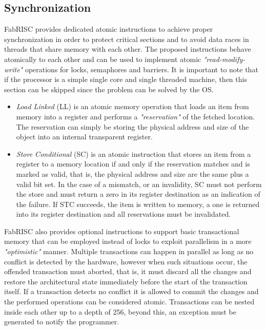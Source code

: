 \documentclass{article}
\begin{document}
        \subsection{Synchronization}

            FabRISC provides dedicated atomic instructions to achieve proper synchronization in order to protect critical sections and to avoid data races in threads that share memory with each other. The proposed instructions behave atomically to each other and can be used to implement atomic \textit{"read-modify-write"} operations for locks, semaphores and barriers. It is important to note that if the processor is a simple single core and single threaded machine, then this section can be skipped since the problem can be solved by the OS.

            \begin{itemize}

                \item \textit{Load Linked} (LL) is an atomic memory operation that loads an item from memory into a register and performs a \textit{"reservation"} of the fetched location. The reservation can simply be storing the physical address and size of the object into an internal transparent register.
                \item \textit{Store Conditional} (SC) is an atomic instruction that stores an item from a register to a memory location if and only if the reservation matches and is marked as valid, that is, the physical address and size are the same plus a valid bit set. In the case of a mismatch, or an invalidity, SC must not perform the store and must return a zero in its register destination as an indication of the failure. If STC succeeds, the item is written to memory, a one is returned into its register destination and all reservations must be invalidated.

            \end{itemize}

            FabRISC also provides optional instructions to support basic transactional memory that can be employed instead of locks to exploit parallelism in a more \textit{"optimistic"} manner. Multiple transactions can happen in parallel as long as no conflict is detected by the hardware, however when such situations occur, the offended transaction must aborted, that is, it must discard all the changes and restore the architectural state immediately before the start of the transaction itself. If a transaction detects no conflict it is allowed to commit the changes and the performed operations can be considered atomic. Transactions can be nested inside each other up to a depth of 256, beyond this, an exception must be generated to notify the programmer.
\end{document}
